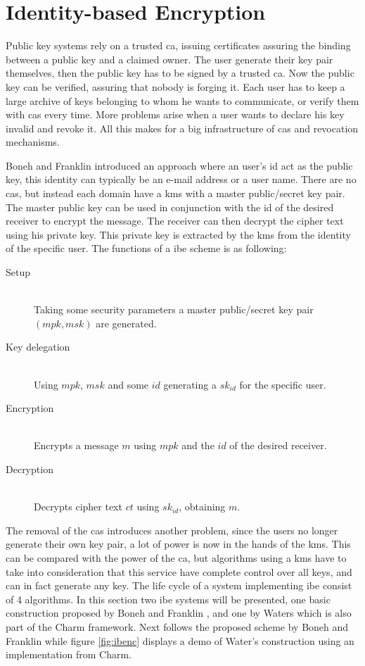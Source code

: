 \section{Identity-based Encryption}\label{subsec:IBE}
Public key systems rely on a trusted \gls{ca}, issuing certificates assuring the binding between a public key and a claimed owner. The user generate their key pair themselves, then the public key has to be signed by a trusted \glsdesc{ca}. Now the public key can be verified, assuring that nobody is forging it. Each user has to keep a large archive of keys belonging to whom he wants to communicate, or verify them with \glspl{ca} every time. More problems arise when a user wants to declare his key invalid and revoke it. All this makes for a big infrastructure of \glspl{ca} and revocation mechanisms. 
\par Boneh and Franklin \cite{DBLP:ibe} introduced an approach where an user's id act as the public key, this identity can typically be an e-mail address or a user name. There are no \glspl{ca}, but instead each domain have a \gls{kms} with a master public/secret key pair. The master public key can be used in conjunction with the id of the desired receiver to encrypt the message. The receiver can then decrypt the cipher text using his private key. This private key is extracted by the \gls{kms} from the identity of the specific user. 
The functions of a \gls{ibe} scheme is as following:
\begin{description}
\item[Setup]\hfill \\ Taking some security parameters a master public/secret key pair $(mpk, msk)$ are generated.
\item[Key delegation]\hfill \\Using $mpk$, $msk$ and some $id$ generating a $sk_{id}$ for the specific user. 
\item[Encryption]\hfill \\ Encrypts a message $m$ using $mpk$ and the $id$ of the desired receiver. 
\item[Decryption] \hfill \\Decrypts cipher text $ct$ using $sk_{id}$, obtaining $m$. 
\end{description}
The removal of the \glspl{ca} introduces another problem, since the users no longer generate their own key pair, a lot of power is now in the hands of the \gls{kms}. This can be compared with the power of the \gls{ca}, but algorithms using a \gls{kms} have to take into consideration that this service have complete control over all keys, and can in fact generate any key. The life cycle of a system implementing \gls{ibe} consist of 4 algorithms. In this section two \gls{ibe} systems will be presented, one basic construction proposed by Boneh and Franklin \cite{DBLP:ibe}, and one by Waters \cite{ibe_waters09} which is also part of the Charm framework. Next follows the proposed scheme by Boneh and Franklin while figure \ref{fig:ibenc} displays a demo of Water's \cite{ibe_waters09} construction using an implementation from Charm.


